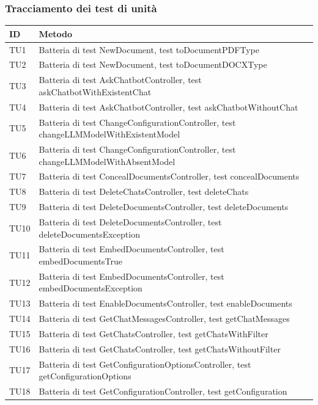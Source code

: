 \documentclass[10pt, a4paper]{article}
\begin{document}
\subsubsection{Tracciamento dei test di unità} 
\renewcommand{\arraystretch}{1.5}
\begin{xltabular}{\textwidth}{p{0.12\textwidth}|X}
\textbf{ID} & \textbf{Metodo} \\
\hline
TU1 & Batteria di test NewDocument, test toDocumentPDFType \\
\hline
TU2 & Batteria di test NewDocument, test toDocumentDOCXType \\
\hline
TU3 & Batteria di test AskChatbotController, test askChatbotWithExistentChat \\
\hline
TU4 & Batteria di test AskChatbotController, test askChatbotWithoutChat \\
\hline
TU5 & Batteria di test ChangeConfigurationController, test changeLLMModelWithExistentModel \\
\hline
TU6 & Batteria di test ChangeConfigurationController, test changeLLMModelWithAbsentModel \\
\hline
TU7 & Batteria di test ConcealDocumentsController, test concealDocuments \\
\hline
TU8 & Batteria di test DeleteChatsController, test deleteChats \\
\hline
TU9 & Batteria di test DeleteDocumentsController, test deleteDocuments \\
\hline
TU10 & Batteria di test DeleteDocumentsController, test deleteDocumentsException \\
\hline
TU11 & Batteria di test EmbedDocumentsController, test embedDocumentsTrue \\
\hline
TU12 & Batteria di test EmbedDocumentsController, test embedDocumentsException \\
\hline
TU13 & Batteria di test EnableDocumentsController, test enableDocuments \\
\hline
TU14 & Batteria di test GetChatMessagesController, test getChatMessages \\
\hline
TU15 & Batteria di test GetChatsController, test getChatsWithFilter \\
\hline
TU16 & Batteria di test GetChatsController, test getChatsWithoutFilter \\
\hline
TU17 & Batteria di test GetConfigurationOptionsController, test getConfigurationOptions \\
\hline
TU18 & Batteria di test GetConfigurationController, test getConfiguration \\

\end{xltabular}
\end{document}
